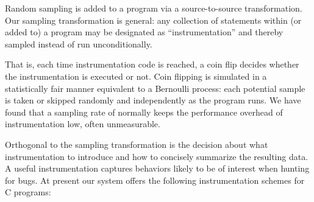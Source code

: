 \documentclass[draft]{sig-alternate}
\newcommand{\issue}[2][]{}
\begin{document}
Random sampling is added to a program via a source-to-source transformation.
Our sampling transformation is general: any collection of
statements within (or added to) a program may be designated as
``instrumentation'' and thereby sampled instead of run
unconditionally.
\issue[Mayur]{"Our sampling transformation is general: any collection
  of stmts within (or added to) a program may be designated as
  "instrumentation" and thereby sampled instead of run conditionally"

  I didn't get the "within (or added to)" part.  I thought
  instrumented code always refers to code that is added, and not code
  that is within?

  Ben later clarified this but we need to put it into the paper:

  We can treat existing code as instrumentation to be sampled even if
  we didn't add it ourself.  assert() statements are a clear candidate
  for this sort of thing.  Our PLDI 2003 paper did this with the
  assert-like statements added by CCured.  From our perspective, that
  code is "within" the program, not "added to" it.}
That is, each time instrumentation code is reached,
a coin flip decides whether the instrumentation is executed or not.
Coin flipping is simulated in a statistically fair
manner equivalent to a Bernoulli process: each potential sample is
taken or skipped randomly and independently as the program runs.
We have found that a sampling rate of  normally keeps the performance overhead
of instrumentation low, often unmeasurable.
\issue[Alice]{Is this true?  I thought Ben's thesis would claim otherwise.}

Orthogonal to the sampling transformation is the decision about what
instrumentation to introduce and how to concisely summarize the
resulting data.  A useful instrumentation captures behaviors likely to
be of interest when hunting for bugs.  At present our system offers
the following instrumentation schemes for C programs:
\end{document}
